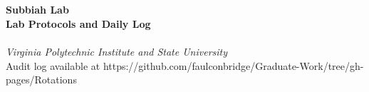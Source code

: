 
\begin{titlepage}
	{~ \\[5cm] }
	
	\noindent \HRule \\[0.4cm]
	{ \Huge \bfseries Subbiah Lab \\[0.4cm] }
	{ \huge \bfseries Lab Protocols and Daily Log \\ }
	\HRule \\[0.4cm]
	
	{ \large \emph{Virginia Polytechnic Institute and State University} }\\[11cm]
	
	\noindent Audit log available at https://github.com/faulconbridge/Graduate-Work/tree/gh-pages/Rotations
\end{titlepage}